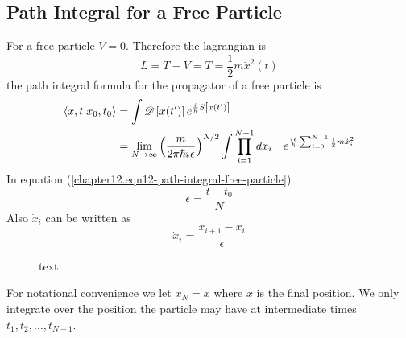 \begin{enumerate}
	\section{Path Integral for a Free Particle}
	For a free particle $V=0$. Therefore the lagrangian is
	\begin{equation}
		L = T - V = T = \frac{1}{2} m \dot{x}^2(t)
		\label{chapter12.eqn11-path-integral-free-particle}
	\end{equation}
	the path integral formula for the propagator of a free particle is
	\begin{align}
		\braket{x, t}{x_0, t_0} 
		&= \int \mathcal{D}\left[x(t^\prime)\right] e^{\frac{{i\mkern1mu}}{\hbar} S\left[x(t^\prime)\right]} \\
		&= \lim\limits_{N \rightarrow \infty} \left(\frac{m}{2 \pi \hbar {i\mkern1mu} \epsilon}\right)^{N/2} \int \prod_{i=1}^{N-1} dx_i \quad e^{\frac{{i\mkern1mu} \epsilon}{\hbar} \sum_{i=0}^{N-1} \frac{1}{2} m \dot{x}_i^2}
		\label{chapter12.eqn12-path-integral-free-particle}
	\end{align}
	In equation (\ref{chapter12.eqn12-path-integral-free-particle})
	\begin{equation}
		\epsilon = \frac{t - t_0}{N}
	\end{equation}
	Also $\dot{x}_i$ can be written as
	\begin{equation}
		\dot{x}_i = \frac{x_{i+1} - x_i}{\epsilon}
		\label{chapter12.eqn13-path-integral-free-particle}
	\end{equation}
	
	\begin{figure}
		\centering
		\caption{text}
		\label{chapter12.fig2}
	\end{figure}
	For notational convenience we let $x_N = x$ where $x$ is the final position. We only integrate over the position the particle may have at intermediate times $t_1, t_2, \ldots, t_{N-1}$.\\
	

\end{enumerate}
